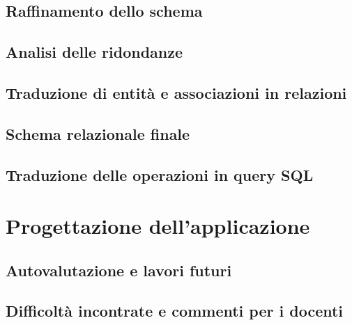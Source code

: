 \documentclass[a4paper,12pt]{report}
\begin{document}
\section{Raffinamento dello schema}
\section{Analisi delle ridondanze}
\section{Traduzione di entità e associazioni in relazioni}
\section{Schema relazionale finale}
\section{Traduzione delle operazioni in query SQL}

\chapter{Progettazione dell'applicazione}
\section{Autovalutazione e lavori futuri}
\section{Difficoltà incontrate e commenti per i docenti}
\end{document}
